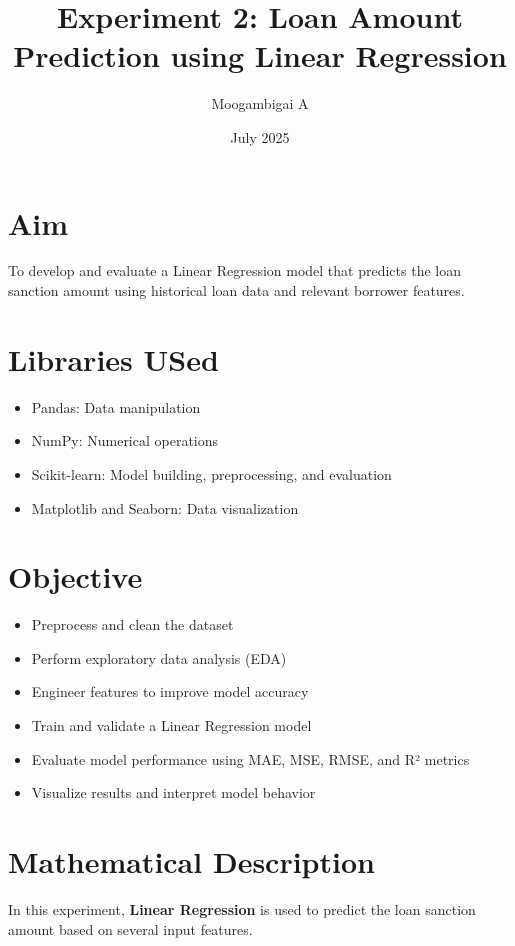 \documentclass{article}
\title{\textbf{Experiment 2: Loan Amount Prediction using Linear Regression}}
\author{Moogambigai A}
\date{July 2025}
\begin{document}
\maketitle

\section{Aim}
To develop and evaluate a Linear Regression model that predicts the loan sanction amount using historical loan data and relevant borrower features.

\section{Libraries USed}
\begin{itemize}
\item Pandas: Data manipulation

\item NumPy: Numerical operations

\item Scikit-learn: Model building, preprocessing, and evaluation

\item Matplotlib and Seaborn: Data visualization
\end{itemize}


\section{Objective}
\begin{itemize}
    \item Preprocess and clean the dataset

\item Perform exploratory data analysis (EDA)

\item Engineer features to improve model accuracy

\item Train and validate a Linear Regression model

\item Evaluate model performance using MAE, MSE, RMSE, and R² metrics

\item Visualize results and interpret model behavior
\end{itemize}

\section{Mathematical Description}
In this experiment, \textbf{Linear Regression} is used to predict the loan sanction amount based on several input features.
\end{document}
